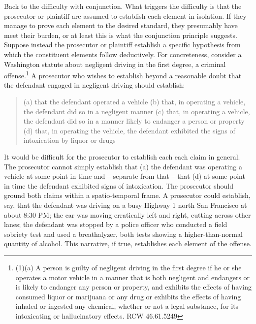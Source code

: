 \documentclass[
  10pt,
  dvipsnames,enabledeprecatedfontcommands]{scrartcl}
\begin{document}
Back to the difficulty with conjunction. What triggers the difficulty is
that the prosecutor or plaintiff are assumed to establish each element
in isolation. If they manage to prove each element to the desired
standard, they presumably have meet their burden, or at least this is
what the conjunction principle suggests. Suppose instead the prosecutor
or plaintiff establish a specific hypothesis from which the constituent
elements follow deductively. For concreteness, consider a Washington
statute about negligent driving in the first degree, a criminal
offense.\footnote{(1)(a) A person is guilty of negligent driving in the
  first degree if he or she operates a motor vehicle in a manner that is
  both negligent and endangers or is likely to endanger any person or
  property, and exhibits the effects of having consumed liquor or
  marijuana or any drug or exhibits the effects of having inhaled or
  ingested any chemical, whether or not a legal substance, for its
  intoxicating or hallucinatory effects. RCW 46.61.5249} A prosecutor
who wishes to establish beyond a reasonable doubt that the defendant
engaged in negligent driving should establish:

\begin{quote}
(a) that the defendant operated a vehicle
(b) that, in operating a vehicle, the defendant did so in a negligent manner
(c) that, in operating a vehicle, the defendant did so in a manner likely to endanger a person or property
(d) that, in operating the vehicle, the defendant exhibited the signs of intoxication by liquor or  drugs
\end{quote}

\noindent

It would be difficult for the prosecutor to establish each each claim in
general. The prosecutor cannot simply establish that (a) the defendant
was operating a vehicle at some point in time and -- separate from that
-- that (d) at some point in time the defendant exhibited signs of
intoxication. The prosecutor should ground both claims within a
spatio-temporal frame. A prosecutor could establish, say, that the
defendant was driving on a busy Highway 1 north San Francisco at about
8:30 PM; the car was moving erratically left and right, cutting across
other lanes; the defendant was stopped by a police officer who conducted
a field sobriety test and used a breathalyzer, both tests showing a
higher-than-normal quantity of alcohol. This narrative, if true,
establishes each element of the offense.
\end{document}
